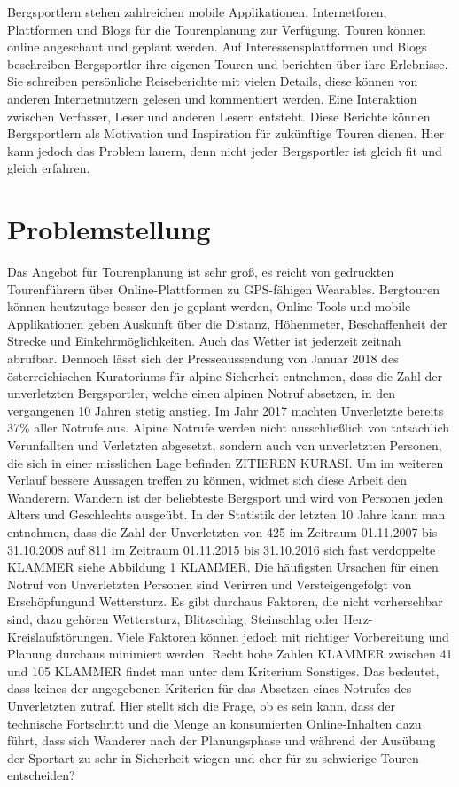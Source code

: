 Bergsportlern stehen zahlreichen mobile Applikationen, Internetforen, Plattformen und Blogs für die Tourenplanung zur Verfügung. Touren können online angeschaut und geplant werden. Auf Interessensplattformen und Blogs beschreiben Bergsportler ihre eigenen Touren und berichten über ihre  Erlebnisse. Sie schreiben persönliche Reiseberichte mit vielen Details, diese können von anderen Internetnutzern gelesen und kommentiert werden. Eine Interaktion zwischen Verfasser, Leser und anderen Lesern entsteht. Diese Berichte können Bergsportlern als Motivation und Inspiration für zukünftige Touren dienen. Hier kann jedoch das Problem lauern, denn nicht jeder Bergsportler ist gleich fit und gleich erfahren.


\section{Problemstellung}

Das Angebot für Tourenplanung ist sehr groß, es reicht von gedruckten Tourenführern über Online-Plattformen zu GPS-fähigen Wearables. Bergtouren können heutzutage besser den je geplant werden, Online-Tools und mobile Applikationen geben Auskunft über die Distanz, Höhenmeter, Beschaffenheit der Strecke und Einkehrmöglichkeiten. Auch das Wetter ist jederzeit zeitnah abrufbar. Dennoch lässt sich der Presseaussendung von Januar 2018 des österreichischen Kuratoriums für alpine Sicherheit entnehmen, dass die Zahl der unverletzten Bergsportler, welche einen alpinen Notruf absetzen, in den vergangenen 10 Jahren stetig anstieg. Im Jahr 2017 machten Unverletzte bereits 37\% aller Notrufe aus. Alpine Notrufe werden nicht ausschließlich von tatsächlich Verunfallten und Verletzten abgesetzt, sondern auch von unverletzten Personen, die sich in einer misslichen Lage befinden ZITIEREN KURASI.
Um im weiteren Verlauf bessere Aussagen treffen zu können, widmet sich diese Arbeit den Wanderern. Wandern ist der beliebteste Bergsport und wird von Personen jeden Alters und Geschlechts ausgeübt.
In der Statistik der letzten 10 Jahre kann man entnehmen, dass die Zahl der Unverletzten von 425 im Zeitraum 01.11.2007 bis 31.10.2008 auf 811 im Zeitraum 01.11.2015 bis 31.10.2016 sich fast verdoppelte KLAMMER siehe Abbildung 1 KLAMMER. Die häufigsten Ursachen für einen Notruf von Unverletzten Personen sind \dq Verirren und Versteigen\dq gefolgt von \dq Erschöpfung\dq und \dq Wettersturz\dq. Es gibt durchaus Faktoren, die nicht vorhersehbar sind, dazu gehören Wettersturz, Blitzschlag, Steinschlag oder Herz-Kreislaufstörungen. Viele Faktoren können jedoch mit richtiger Vorbereitung und Planung durchaus minimiert werden. Recht hohe Zahlen KLAMMER zwischen 41 und 105 KLAMMER findet man unter dem Kriterium \dq Sonstiges\dq. Das bedeutet, dass keines der angegebenen Kriterien für das Absetzen eines Notrufes des Unverletzten zutraf. Hier stellt sich die Frage, ob es sein kann, dass der technische Fortschritt und die Menge an konsumierten Online-Inhalten dazu führt, dass sich Wanderer nach der Planungsphase und während der Ausübung der Sportart zu sehr in Sicherheit wiegen und eher für zu schwierige Touren entscheiden?

